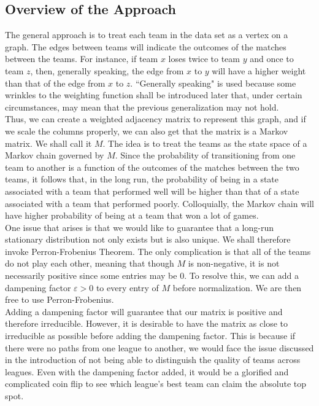 \documentclass[10pt]{article}
\begin{document}
\subsection{Overview of the Approach}
The general approach is to treat each team in the data set as a vertex on a graph. The edges between teams will indicate the outcomes of the matches between the teams. For instance, if team $x$ loses twice to team $y$ and once to team $z$, then, generally speaking, the edge from $x$ to $y$ will have a higher weight than that of the edge from $x$ to $z$. ``Generally speaking" is used because some wrinkles to the weighting function shall be introduced later that, under certain circumstances, may mean that the previous generalization may not hold.\vspace{0.5cm}\\
Thus, we can create a weighted adjacency matrix to represent this graph, and if we scale the columns properly, we can also get that the matrix is a Markov matrix. We shall call it $M$. The idea is to treat the teams as the state space of a Markov chain governed by $M$. Since the probability of transitioning from one team to another is a function of the outcomes of the matches between the two teams, it follows that, in the long run, the probability of being in a state associated with a team that performed well will be higher than that of a state associated with a team that performed poorly. Colloquially, the Markov chain will have higher probability of being at a team that won a lot of games.\vspace{0.5cm}\\
One issue that arises is that we would like to guarantee that a long-run stationary distribution not only exists but is also unique. We shall therefore invoke Perron-Frobenius Theorem. The only complication is that all of the teams do not play each other, meaning that though $M$ is non-negative, it is not necessarily positive since some entries may be 0. To resolve this, we can add a dampening factor $\varepsilon>0$ to every entry of $M$ before normalization. We are then free to use Perron-Frobenius.\vspace{0.5cm}\\
Adding a dampening factor will guarantee that our matrix is positive and therefore irreducible. However, it is desirable to have the matrix as close to irreducible as possible before adding the dampening factor. This is because if there were no paths from one league to another, we would face the issue discussed in the introduction of not being able to distinguish the quality of teams across leagues. Even with the dampening factor added, it would be a glorified and complicated coin flip to see which league's best team can claim the absolute top spot.\vspace{0.5cm}\\
\end{document}
